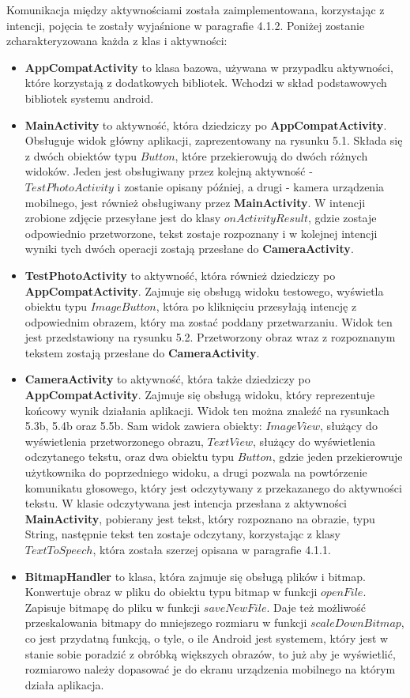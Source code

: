 \documentclass[eng,oneside]{mgr}
\begin{document}
Komunikacja między aktywnościami została zaimplementowana, korzystając z intencji, pojęcia te zostały wyjaśnione w paragrafie 4.1.2. Poniżej zostanie zcharakteryzowana każda z klas i aktywności:
\begin{itemize}
\item \textbf{AppCompatActivity} to klasa bazowa, używana w przypadku aktywności, które korzystają z dodatkowych bibliotek. Wchodzi w skład podstawowych bibliotek systemu android\cite{appcompat}. 
\item \textbf{MainActivity} to aktywność, która dziedziczy po \textbf{AppCompatActivity}. Obsługuje widok główny aplikacji, zaprezentowany na rysunku 5.1. Składa się z dwóch obiektów typu $Button$, które przekierowują do dwóch różnych widoków. Jeden jest obsługiwany przez kolejną aktywność - $TestPhotoActivity$ i zostanie opisany później, a drugi - kamera urządzenia mobilnego, jest również obsługiwany przez \textbf{MainActivity}. W intencji zrobione zdjęcie przesyłane jest do klasy $onActivityResult$, gdzie zostaje odpowiednio przetworzone, tekst zostaje rozpoznany i w kolejnej intencji wyniki tych dwóch operacji zostają przesłane do \textbf{CameraActivity}.
\item \textbf{TestPhotoActivity} to aktywność, która również dziedziczy po \textbf{AppCompatActivity}. Zajmuje się obsługą widoku testowego, wyświetla obiektu typu $ImageButton$, która po kliknięciu przesyłają intencję z odpowiednim obrazem, który ma zostać poddany przetwarzaniu. Widok ten jest przedstawiony na rysunku 5.2. Przetworzony obraz wraz z rozpoznanym tekstem zostają przesłane do \textbf{CameraActivity}.
\item \textbf{CameraActivity} to aktywność, która także dziedziczy po \textbf{AppCompatActivity}. Zajmuje się obsługą widoku, który reprezentuje końcowy wynik działania aplikacji. Widok ten można znaleźć na rysunkach 5.3b, 5.4b oraz 5.5b. Sam widok zawiera obiekty: $ImageView$, służący do wyświetlenia przetworzonego obrazu, $TextView$, służący do wyświetlenia odczytanego tekstu, oraz dwa obiektu typu $Button$, gdzie jeden przekierowuje użytkownika do poprzedniego widoku, a drugi pozwala na powtórzenie komunikatu głosowego, który jest odczytywany z przekazanego do aktywności tekstu. W klasie odczytywana jest intencja przesłana z aktywności \textbf{MainActivity}, pobierany jest tekst, który rozpoznano na obrazie, typu String, następnie tekst ten zostaje odczytany, korzystając z klasy $TextToSpeech$, która została szerzej opisana w paragrafie 4.1.1.
\item \textbf{BitmapHandler} to klasa, która zajmuje się obsługą plików i bitmap. Konwertuje obraz w pliku do obiektu typu bitmap w funkcji $openFile$. Zapisuje bitmapę do pliku w funkcji $saveNewFile$. Daje też możliwość przeskalowania bitmapy do mniejszego rozmiaru w funkcji $scaleDownBitmap$, co jest przydatną funkcją, o tyle, o ile Android jest systemem, który jest w stanie sobie poradzić z obróbką większych obrazów, to już aby je wyświetlić, rozmiarowo należy dopasować je do ekranu urządzenia mobilnego na którym działa aplikacja.

\end{itemize}
\end{document}

